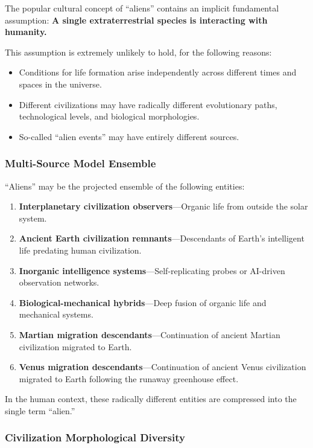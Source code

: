\documentclass[aps,prd,twocolumn,superscriptaddress,nofootinbib]{revtex4-2}
\begin{document}
The popular cultural concept of ``aliens'' contains an implicit fundamental assumption: \textbf{A single extraterrestrial species is interacting with humanity.}

This assumption is extremely unlikely to hold, for the following reasons:

\begin{itemize}
  \item Conditions for life formation arise independently across different times and spaces in the universe.
  \item Different civilizations may have radically different evolutionary paths, technological levels, and biological morphologies.
  \item So-called ``alien events'' may have entirely different sources.
\end{itemize}

\subsubsection{Multi-Source Model Ensemble}\label{sec:multi-source}

``Aliens'' may be the projected ensemble of the following entities:

\begin{enumerate}
  \item \textbf{Interplanetary civilization observers}---Organic life from outside the solar system.
  \item \textbf{Ancient Earth civilization remnants}---Descendants of Earth's intelligent life predating human civilization.
  \item \textbf{Inorganic intelligence systems}---Self-replicating probes or AI-driven observation networks.
  \item \textbf{Biological-mechanical hybrids}---Deep fusion of organic life and mechanical systems.
  \item \textbf{Martian migration descendants}---Continuation of ancient Martian civilization migrated to Earth.
  \item \textbf{Venus migration descendants}---Continuation of ancient Venus civilization migrated to Earth following the runaway greenhouse effect.
\end{enumerate}

In the human context, these radically different entities are compressed into the single term ``alien.''

\subsubsection{Civilization Morphological Diversity}\label{sec:morphological}
\end{document}
